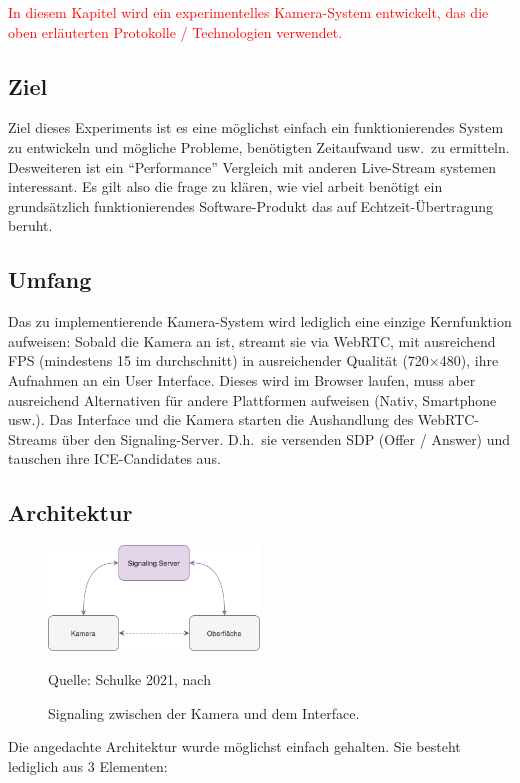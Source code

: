\documentclass{article}
\newcommand{\figuresource}[1]{
	\begin{center}Quelle: #1\end{center}
}
\begin{document}
\begin{onecolumn}
\textcolor{red}{In diesem Kapitel wird ein experimentelles Kamera-System
entwickelt, das die oben erläuterten Protokolle / Technologien verwendet.}

\subsection{Ziel}
Ziel dieses Experiments ist es eine möglichst einfach ein funktionierendes
System zu entwickeln und mögliche Probleme, benötigten Zeitaufwand usw.\ zu
ermitteln.  Desweiteren ist ein ``Performance'' Vergleich mit anderen
Live-Stream systemen interessant. Es gilt also die frage zu klären, wie viel
arbeit benötigt ein grundsätzlich funktionierendes Software-Produkt das auf
Echtzeit-Übertragung beruht.

\subsection{Umfang}

Das zu implementierende Kamera-System wird lediglich eine einzige
Kernfunktion aufweisen: Sobald die Kamera an ist, streamt sie via
WebRTC, mit ausreichend FPS (mindestens 15 im durchschnitt) in
ausreichender Qualität (720$\times$480), ihre Aufnahmen an ein User
Interface. Dieses wird im Browser laufen, muss aber ausreichend
Alternativen für andere Plattformen aufweisen (Nativ, Smartphone
usw.). Das Interface und die Kamera starten die Aushandlung des
WebRTC-Streams über den Signaling-Server. D.h.\ sie versenden SDP
(Offer / Answer) und tauschen ihre ICE-Candidates aus.

\subsection{Architektur}

\begin{figure}[ht]
	\includegraphics[width=0.5\textwidth]{diagram-signaling}
	\centering
	\caption{Signaling zwischen der Kamera und dem Interface.}
	\figuresource{Schulke 2021, nach~\cite{WebRTC}}
\end{figure}

Die angedachte Architektur wurde möglichst einfach gehalten. Sie besteht
lediglich aus 3 Elementen:


\end{onecolumn}
\end{document}
